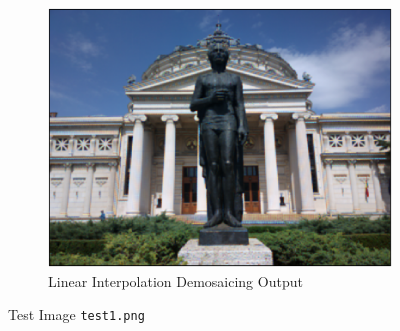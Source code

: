 \documentclass[12pt]{article}
\begin{document}
\begin{figure}[htp]
\begin{subfigure}[b]{0.53\textwidth}
        \centering
        \includegraphics[width=\textwidth]{test1_interp}
        \caption{Linear Interpolation Demosaicing Output}
        \label{fig:test1_interp}
    \end{subfigure}
       \caption{Test Image \texttt{test1.png}}
       \label{fig:test1}
\end{figure}
\end{document}
